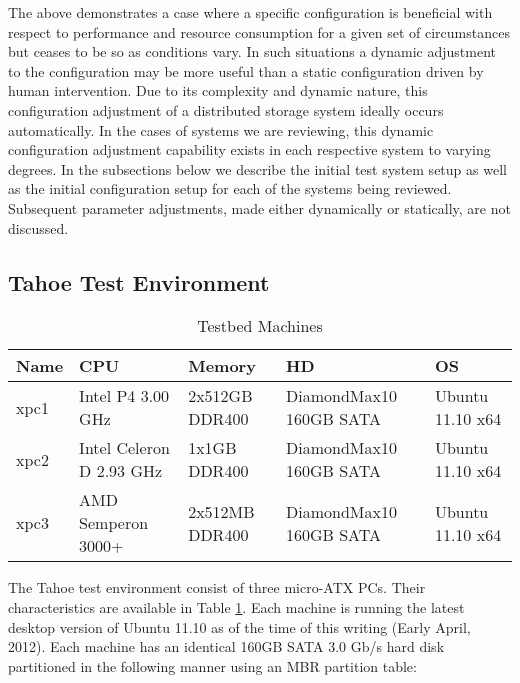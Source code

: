 \documentclass[11pt]{article}
\begin{document}
The above demonstrates a case where a specific configuration is beneficial 
with respect to performance and resource consumption for a given set of 
circumstances but ceases to be so as conditions vary. In such situations 
a dynamic adjustment to the configuration may be more useful than a static 
configuration driven by human intervention. Due to its complexity and 
dynamic nature, this configuration adjustment of a distributed storage 
system ideally occurs automatically. In the cases of systems we are 
reviewing, this dynamic configuration adjustment capability exists in 
each respective system to varying degrees. In the subsections below we 
describe the initial test system setup as well as the initial 
configuration setup for each of the systems being reviewed. Subsequent 
parameter adjustments, made either dynamically or statically, are not 
discussed.  

\subsection{Tahoe Test Environment}

\begin{table}
  \begin{center}
    \begin{tabularx}{\textwidth}{|X|X|X|X|X|}
      \hline
      {\bf Name} & {\bf CPU} & {\bf Memory} & {\bf HD} & {\bf OS} \\ \hline
      xpc1 & Intel P4 3.00 GHz & 2x512GB DDR400
      & DiamondMax10 160GB SATA & Ubuntu 11.10 x64 \\ \hline
      xpc2 & Intel Celeron D 2.93 GHz & 1x1GB DDR400
      & DiamondMax10 160GB SATA & Ubuntu 11.10 x64 \\ \hline
      xpc3 & AMD Semperon 3000+ & 2x512MB DDR400
      & DiamondMax10 160GB SATA & Ubuntu 11.10 x64 \\ \hline
    \end{tabularx}
    \caption{Testbed Machines}
    \label{tbl:testbed}
  \end{center}
\end{table}

The Tahoe test environment consist of three micro-ATX PCs. Their
characteristics are available in Table \ref{tbl:testbed}. Each machine
is running the latest desktop version of Ubuntu 11.10 as of the time
of this writing (Early April, 2012).
Each machine has an identical 160GB SATA 3.0 Gb/s hard disk
partitioned in the following manner using an MBR partition table:
\end{document}
